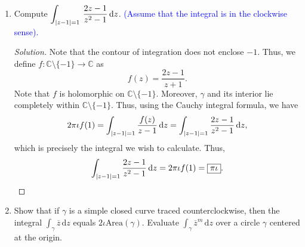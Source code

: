 \documentclass[11pt]{article}
\theoremstyle{definition}
\newenvironment{soln}{\begin{proof}[Solution]}{\end{proof}}
\begin{document}
\begin{enumerate}[leftmargin=*]
\begin{soln}
\begin{enumerate}
	    \item Note that $z^2$ admits a primitive on $\mathbb{C}$ and $\gamma$ is a closed curve. Thus, 
	    \[
	        \int_{\gamma} z^2 \, \mathrm{d}z = \boxed{0}.
	    \]
	\end{enumerate}
	\end{soln}
	
	\item Compute $\displaystyle\int_{\abs{z-1}=1} \, \dfrac{2z-1}{z^2-1} \, \mathrm{d}z$. \textcolor{blue}{(Assume that the integral is in the clockwise sense).}
	
\begin{soln}
Note that the contour of integration does not enclose $-1$. Thus, we define $f \colon \mathbb{C} \setminus \{-1\} \to \mathbb{C}$ as
\[
    f(z) = \frac{2z-1}{z+1}.
\]
Note that $f$ is holomorphic on $\mathbb{C} \setminus \{-1\}$. Moreover, $\gamma$ and its interior lie completely within $\mathbb{C} \setminus \{-1\}$. Thus, using the Cauchy integral formula, we have
\[
    2\pi\iota f(1) = \int_{\abs{z-1}=1} \frac{f(z)}{z-1} \, \mathrm{d}z = \int_{\abs{z-1} = 1} \frac{2z-1}{z^2 - 1} \, \mathrm{d}z,
\]
which is precisely the integral we wish to calculate. Thus,
\[
    \int_{\abs{z-1} = 1} \frac{2z-1}{z^2 - 1} \, \mathrm{d}z = 2\pi\iota f(1) = \boxed{\pi\iota}.
\]
\end{soln}

\item Show that if $\gamma$ is a simple closed curve traced counterclockwise, then the integral $\displaystyle\int_{\gamma} \overline{z} \, \mathrm{d}z$ equals $2\iota \text{Area}(\gamma)$. Evaluate $\displaystyle\int_{\gamma} \overline{z}^m \, \mathrm{d}z$ over a circle $\gamma$ centered at the origin.


\end{enumerate}
\end{document}
